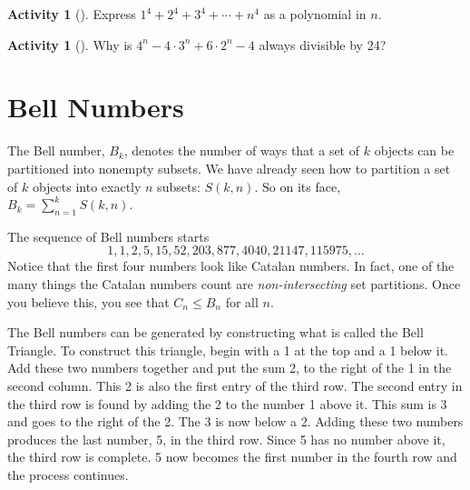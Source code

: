 \documentclass[10pt,]{book}
\theoremstyle{plain}
\theoremstyle{definition}
\theoremstyle{definition}
\theoremstyle{definition}
\newtheorem{activity}[project]{Activity}
\numberwithin{equation}{chapter}
\begin{document}
\begin{activity}[]\label{activity-288}
\hypertarget{p-1465}{}%
Express \(1^4 + 2^4 + 3^4 + \cdots + n^4\) as a polynomial in \(n\).%
\end{activity}
\begin{activity}[]\label{activity-289}
\hypertarget{p-1466}{}%
Why is \(4^n - 4\cdot 3^n + 6\cdot 2^n - 4\) always divisible by 24?%
\end{activity}
\typeout{************************************************}
\typeout{************************************************}
\section[{Bell Numbers}]{Bell Numbers}\label{sec_adv-bell}
\hypertarget{p-1467}{}%
The Bell number, \(B_{k}\), denotes the number of ways that a set of \(k\) objects can be partitioned into nonempty subsets. We have already seen how to partition a set of \(k\) objects into exactly \(n\) subsets: \(S(k,n)\).  So on its face, \(B_k = \sum_{n=1}^kS(k,n)\).%
\par
\hypertarget{p-1468}{}%
The sequence of Bell numbers starts%
\begin{equation*}
1, 1, 2, 5, 15, 52, 203, 877, 4040, 21147, 115975, \ldots
\end{equation*}
Notice that the first four numbers look like Catalan numbers.  In fact, one of the many things the Catalan numbers count are \emph{non-intersecting} set partitions.  Once you believe this, you see that \(C_n \le B_n\) for all \(n\).%
\par
\hypertarget{p-1469}{}%
The Bell numbers can be generated by constructing what is called the Bell Triangle. To construct this triangle, begin with a 1 at the top and a 1 below it. Add these two numbers together and put the sum 2, to the right of the 1 in the second column. This 2 is also the first entry of the third row. The second entry in the third row is found by adding the 2 to the number 1 above it. This sum is 3 and goes to the right of the 2. The 3 is now below a 2. Adding these two numbers produces the last number, 5, in the third row. Since 5 has no number above it, the third row is complete. 5 now becomes the first number in the fourth row and the process continues.%
\end{document}
